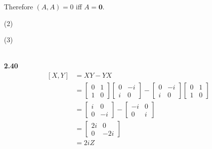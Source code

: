 \documentclass[10pt]{book}
\newcommand{\Textbf}[1]{\hspace{3mm}\\ \textbf{#1}\\}
\begin{document}
	Therefore $(A, A) = 0$ iff $A = \mathbf{0}$.
	
	\vspace{5mm}
	(2)
	
	(3)
	
	
	
	\Textbf{2.40}
	\begin{equation}
\begin{aligned}
		\left[X, Y \right] &=XY - YX\\
		&= \begin{bmatrix}
			0 & 1 \\
			1 & 0
		\end{bmatrix}
		\begin{bmatrix}
			0 & -i \\
			i & 0
		\end{bmatrix}
		-
		\begin{bmatrix}
			0 & -i \\
			i & 0
		\end{bmatrix}
		\begin{bmatrix}
			0 & 1 \\
			1 & 0
		\end{bmatrix} \\
		&=
		\begin{bmatrix}
			i & 0 \\
			0 & -i
		\end{bmatrix}
		-
		\begin{bmatrix}
			-i & 0 \\
			0 & i
		\end{bmatrix}\\
		&=
		\begin{bmatrix}
			2i & 0 \\
			0 & -2i
		\end{bmatrix} \\
		&=	2i Z
	\end{aligned}
\end{equation}
	
	
	
\end{document}
